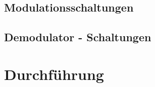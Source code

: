 \subsection{Modulationsschaltungen}
\label{subsec:debye}

\subsection{Demodulator - Schaltungen}
\label{subsec:debye}

\section{Durchführung}
\label{sec:durchführung}
